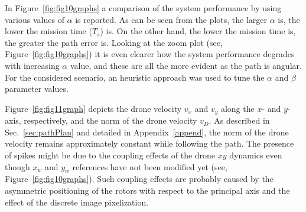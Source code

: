 \documentclass[a4paper,twocolumn,10pt]{article}
\begin{document}
    In Figure~\ref{fig:fig10graphs} a comparison of the system performance by using various values of $\alpha$ is reported. As can be seen from the plots, the larger $\alpha$ is, the lower the mission time ($T_s$) is. On the other hand, the lower the mission time is, the greater the path 
    error is. Looking at the zoom plot (see, Figure~\ref{fig:fig10graphs}) it is even clearer how the system performance degrades with increasing $\alpha$ value, and these are all the more evident as the path is angular. For the considered scenario, an heuristic approach was used to tune the $\alpha$ and $\beta$ parameter values.

    Figure~\ref{fig:fig11graph} depicts the drone velocity $v_x$ and $v_y$ along the $x$- and $y$-axis, respectively, and the norm of the drone velocity $v_D$. As described in 
    Sec.~\ref{sec:pathPlan} and detailed in Appendix~\ref{append}, the norm of the drone velocity remains approximately constant while following the path. The presence of spikes might be due to the coupling effects of the drone $xy$ dynamics even though $x_w$ and $y_w$ references have not been 
    modified yet (see, Figure~\ref{fig:fig10graphs}). Such coupling effects are probably caused by the asymmetric positioning of the rotors with respect to the principal axis and the effect of the discrete image pixelization. 
\end{document}
